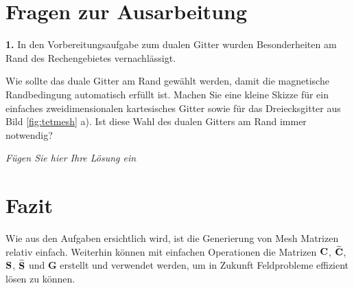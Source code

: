 \documentclass[Protokollheft.tex]{subfiles}
\begin{document}
\section{Fragen zur Ausarbeitung}

\begin{framed}
	\noindent \textbf{1.} In den Vorbereitungsaufgabe zum dualen Gitter wurden
Besonderheiten am Rand des Rechengebietes vernachlässigt.

Wie sollte das duale Gitter am Rand gewählt werden, damit die magnetische
Randbedingung automatisch erfüllt ist. Machen Sie eine kleine Skizze
für ein einfaches zweidimensionalen kartesisches Gitter sowie für
das Dreiecksgitter aus Bild \ref{fig:tetmesh} a). Ist diese Wahl
des dualen Gitters am Rand immer notwendig?\label{exer:autoHomNeumann}
\end{framed}

\emph{Fügen Sie hier Ihre Lösung ein}



\section{Fazit}
Wie aus den Aufgaben ersichtlich wird, ist die Generierung von Mesh Matrizen relativ einfach. Weiterhin können mit einfachen Operationen die Matrizen $\mathbf{C}$, $\widetilde{\mathbf{C}}$, $\mathbf{S}$, $\widetilde{\mathbf{S}}$ und $\mathbf{G}$ erstellt und verwendet werden, um in Zukunft Feldprobleme effizient lösen zu können. 
\end{document}
